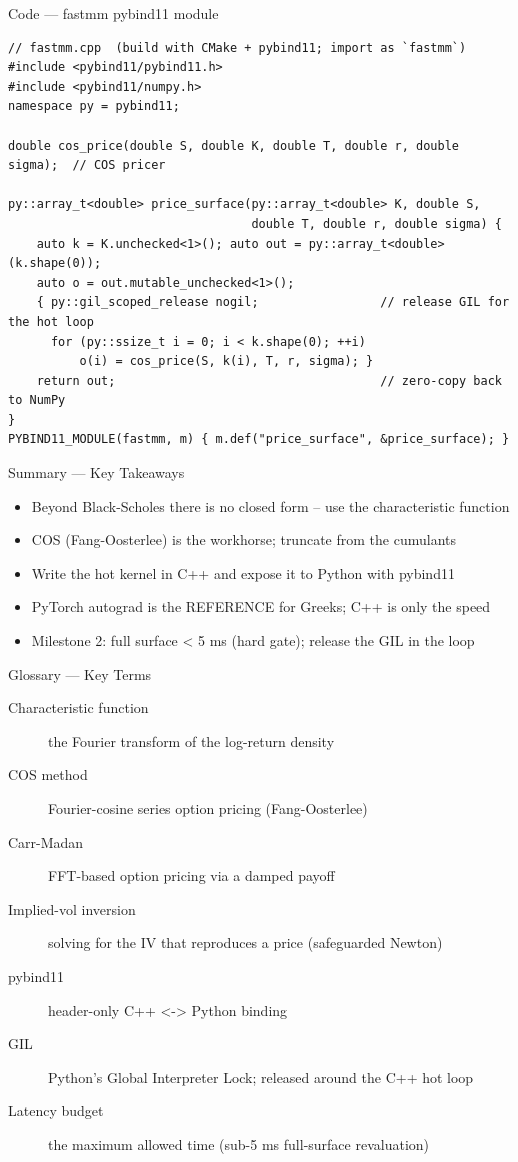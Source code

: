 \documentclass[aspectratio=169,10pt]{beamer}
\begin{document}
\begin{frame}[fragile]{Code --- fastmm pybind11 module}
\begin{lstlisting}
// fastmm.cpp  (build with CMake + pybind11; import as `fastmm`)
#include <pybind11/pybind11.h>
#include <pybind11/numpy.h>
namespace py = pybind11;

double cos_price(double S, double K, double T, double r, double sigma);  // COS pricer

py::array_t<double> price_surface(py::array_t<double> K, double S,
                                  double T, double r, double sigma) {
    auto k = K.unchecked<1>(); auto out = py::array_t<double>(k.shape(0));
    auto o = out.mutable_unchecked<1>();
    { py::gil_scoped_release nogil;                 // release GIL for the hot loop
      for (py::ssize_t i = 0; i < k.shape(0); ++i)
          o(i) = cos_price(S, k(i), T, r, sigma); }
    return out;                                     // zero-copy back to NumPy
}
PYBIND11_MODULE(fastmm, m) { m.def("price_surface", &price_surface); }
\end{lstlisting}
\end{frame}
\begin{frame}{Summary --- Key Takeaways}
\begin{itemize}
  \item Beyond Black-Scholes there is no closed form -- use the characteristic function
  \item COS (Fang-Oosterlee) is the workhorse; truncate from the cumulants
  \item Write the hot kernel in C++ and expose it to Python with pybind11
  \item PyTorch autograd is the REFERENCE for Greeks; C++ is only the speed
  \item Milestone 2: full surface \textless{} 5 ms (hard gate); release the GIL in the loop
\end{itemize}
\end{frame}

\begin{frame}{Glossary --- Key Terms}
\footnotesize\begin{description}
\item[\color{ncsured}Characteristic function] the Fourier transform of the log-return density
\item[\color{ncsured}COS method] Fourier-cosine series option pricing (Fang-Oosterlee)
\item[\color{ncsured}Carr-Madan] FFT-based option pricing via a damped payoff
\item[\color{ncsured}Implied-vol inversion] solving for the IV that reproduces a price (safeguarded Newton)
\item[\color{ncsured}pybind11] header-only C++ \textless{}-\textgreater{} Python binding
\item[\color{ncsured}GIL] Python's Global Interpreter Lock; released around the C++ hot loop
\item[\color{ncsured}Latency budget] the maximum allowed time (sub-5 ms full-surface revaluation)
\end{description}
\end{frame}
\end{document}
